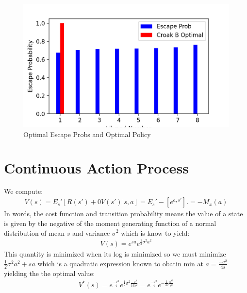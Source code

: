 \documentclass{article}[12pt]
\begin{document}
\begin{figure}
  \includegraphics[width=\linewidth]{llp_8.png}
  \caption{Optimal Escape Probs and Optimal Policy}
  \label{fig:llp9}
\end{figure}

\section{Continuous Action Process}

We compute:
\begin{align*}
V(s) = E_s'[R(s') + 0V(s') | s,a] = E_s'-[e^{a,s'}]. = -M_x(a)
\end{align*}
In words, the cost function and transition probability means the value of a state is given by the negative of the moment generating function of a normal distribution of mean $s$ and variance $\sigma^2$ which is know to yield:
\begin{align*}
V(s) = e^{sa}e^{\frac{1}{2}\sigma^2 a^2}
\end{align*}
This quantity is minimized when its log is minimized so we must minimize $\frac{1}{2}\sigma^2a^2 + sa$ which is a quadratic expression known to obatin min at $a = \frac{-\sigma^2}{4s}$ yielding the the optimal value:
\begin{align*}
V^*(s) = e^{\frac{-\sigma^2}{4}}e^{\frac{1}{2}\sigma^2 \frac{-\sigma^4}{16s^2}} =  e^{\frac{-\sigma^2}{4}}e^{-\frac{1}{32} \frac{\sigma^6}{s^2}}
\end{align*}
\end{document}
